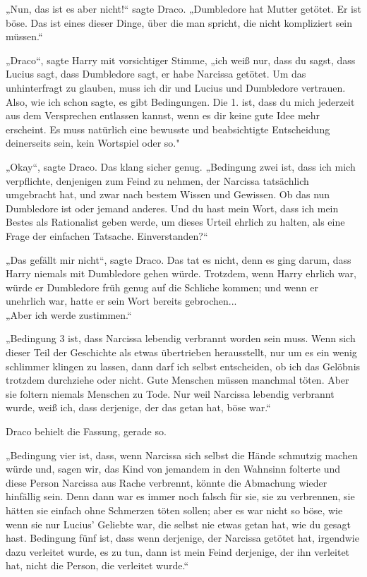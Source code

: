 {„Nun, das ist es aber nicht!“ sagte Draco. „Dumbledore hat Mutter getötet. Er ist böse. Das ist eines dieser Dinge, über die man spricht, die nicht kompliziert sein müssen.“

„Draco“, sagte Harry mit vorsichtiger Stimme, „ich weiß nur, dass du sagst, dass Lucius sagt, dass Dumbledore sagt, er habe Narcissa getötet. Um das unhinterfragt zu glauben, muss ich dir und Lucius und Dumbledore vertrauen. Also, wie ich schon sagte, es gibt Bedingungen. Die 1. ist, dass du mich jederzeit aus dem Versprechen entlassen kannst, wenn es dir keine gute Idee mehr erscheint. Es muss natürlich eine bewusste und beabsichtigte Entscheidung deinerseits sein, kein Wortspiel oder so."

„Okay“, sagte Draco. Das klang sicher genug. „Bedingung zwei ist, dass ich mich verpflichte, denjenigen zum Feind zu nehmen, der Narcissa tatsächlich umgebracht hat, und zwar nach bestem Wissen und Gewissen. Ob das nun Dumbledore ist oder jemand anderes. Und du hast mein Wort, dass ich mein Bestes als Rationalist geben werde, um dieses Urteil ehrlich zu halten, als eine Frage der einfachen Tatsache. Einverstanden?“

„Das gefällt mir nicht“, sagte Draco. Das tat es nicht, denn es ging darum, dass Harry niemals mit Dumbledore gehen würde. Trotzdem, wenn Harry ehrlich war, würde er Dumbledore früh genug auf die Schliche kommen; und wenn er unehrlich war, hatte er sein Wort bereits gebrochen...\\ „Aber ich werde zustimmen.“

„Bedingung 3 ist, dass Narcissa lebendig verbrannt worden sein muss. Wenn sich dieser Teil der Geschichte als etwas übertrieben herausstellt, nur um es ein wenig schlimmer klingen zu lassen, dann darf ich selbst entscheiden, ob ich das Gelöbnis trotzdem durchziehe oder nicht. Gute Menschen müssen manchmal töten. Aber sie foltern niemals Menschen zu Tode. Nur weil Narcissa lebendig verbrannt wurde, weiß ich, dass derjenige, der das getan hat, böse war.“

Draco behielt die Fassung, gerade so.

„Bedingung vier ist, dass, wenn Narcissa sich selbst die Hände schmutzig machen würde und, sagen wir, das Kind von jemandem in den Wahnsinn folterte und diese Person Narcissa aus Rache verbrennt, könnte die Abmachung wieder hinfällig sein. Denn dann war es immer noch falsch für sie, sie zu verbrennen, sie hätten sie einfach ohne Schmerzen töten sollen; aber es war nicht so böse, wie wenn sie nur Lucius' Geliebte war, die selbst nie etwas getan hat, wie du gesagt hast. Bedingung fünf ist, dass wenn derjenige, der Narcissa getötet hat, irgendwie dazu verleitet wurde, es zu tun, dann ist mein Feind derjenige, der ihn verleitet hat, nicht die Person, die verleitet wurde.“

}
